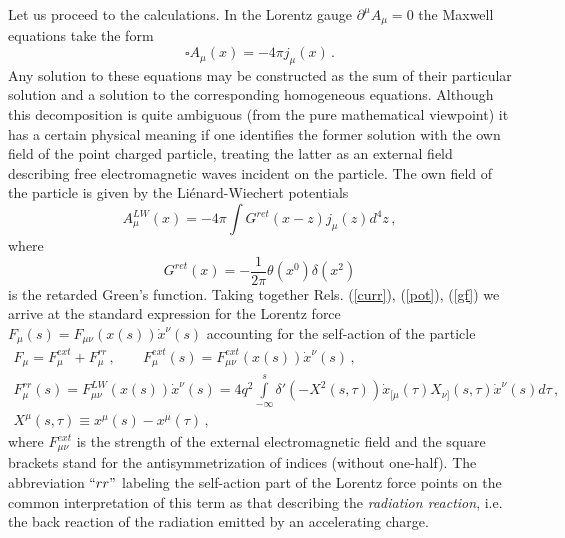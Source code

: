 \documentclass[a4paper,12pt]{article}
\begin{document}
Let us proceed to the calculations. In the Lorentz gauge
$\partial^\mu A_\mu=0$ the Maxwell equations take the form
\begin{equation}\label{}
\square A_\mu(x)=-4\pi j_\mu(x)\,.
\end{equation}
Any solution to these equations may be constructed as the sum of
their particular solution and a solution to the corresponding
homogeneous equations. Although this decomposition is quite
ambiguous (from the pure mathematical viewpoint) it has a certain
physical meaning if one identifies the former solution with the
own field of the point charged particle,  treating  the latter as
an external field describing free electromagnetic waves incident
on the particle. The own field of the particle is given by the
Li\'enard-Wiechert potentials
\begin{equation} \label{pot}
A^{LW}_{\mu}(x)=-4\pi{}\int{G^{ret}(x-z)j_{\mu}(z)d^4z}\,,
\end{equation}
where
\begin{equation}\label{gf}
G^{ret}(x)=-\frac{1}{2\pi}\theta (x^0 )\delta (x^2)
\end{equation}
is the retarded Green's function. Taking together Rels.
(\ref{curr}), (\ref{pot}), (\ref{gf})  we arrive at the standard
expression for the Lorentz force
$F_\mu(s)=F_{\mu\nu}(x(s))\dot{x}^{\nu}(s)$ accounting for the
self-action of the particle
\begin{equation}\label{force}
\begin{array}{c}
F_\mu=F_\mu^{ext}+F_\mu^{rr}\,,\;\;\;\;\;\;\;
F^{ext}_\mu(s)=F_{\mu\nu}^{ext}(x(s))\dot{x}^\nu(s)\,,\\[5mm]
\displaystyle{F^{rr}_\mu (s) =
F_{\mu\nu}^{LW}(x(s))\dot{x}^\nu(s)=4q^2\int\limits_{-\infty}^s
\delta '(-X^2(s,\tau ))\dot x_{[\mu } (\tau )X_{\nu ]}(s,\tau)
\dot
x^\nu (s)d\tau}\,,\\[8mm]
X^\mu(s,\tau)\equiv x^\mu(s)-x^\mu({\tau})\,,
\end{array}
\end{equation}
where $F^{ext}_{\mu\nu}$ is the strength of the external
electromagnetic field and the square brackets stand for the
antisymmetrization of indices (without one-half). The
abbreviation $``rr"$ labeling the self-action part of the Lorentz
force points on the common interpretation of this term as that
describing the \textit{radiation reaction}, i.e. the back reaction
of the radiation emitted by an accelerating charge.
\end{document}
